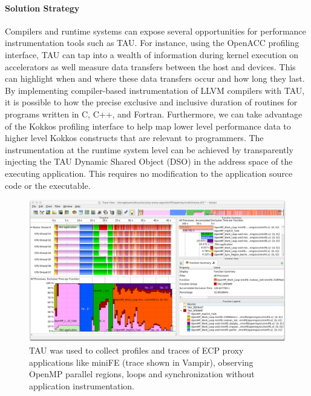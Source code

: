 \paragraph{Solution Strategy} Compilers and runtime systems can expose several opportunities for performance instrumentation tools such as TAU.  For instance, using the OpenACC profiling interface, TAU can tap into a wealth of information during kernel execution on accelerators as well measure data transfers between the host and devices. This can highlight when and where these data transfers occur and how long they last.  By implementing compiler-based instrumentation of LLVM compilers with TAU, it is possible to how the precise exclusive and inclusive duration of routines for programs written in C, C++, and Fortran.  Furthermore, we can take advantage of the Kokkos profiling interface to help map lower level performance data to higher level Kokkos constructs that are relevant to programmers. The instrumentation at the runtime system level can be achieved by transparently injecting the TAU Dynamic Shared Object (DSO) in the address space of the executing application. This requires no modification to the application source code or the executable. 

\begin{figure}[htb]
\centering
\includegraphics[width=6in]{projects/2.3.2-Tools/2.3.2.10-PROTEAS-YTUNE/miniFE_openmp_tau.png}
\caption{TAU was used to collect profiles and traces of ECP proxy applications like miniFE (trace shown in Vampir), observing OpenMP parallel regions, loops and synchronization without application instrumentation.}
\label{figure:tau:openmp}
\end{figure}

